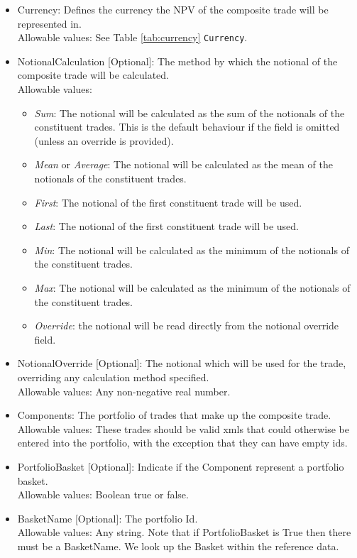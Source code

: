 \begin{itemize}
	\item Currency: Defines the currency the NPV of the composite trade will be represented in. \\
	  Allowable values:  See Table \ref{tab:currency} \lstinline!Currency!.
	\item NotionalCalculation [Optional]: The method by which the notional of the composite trade will be calculated. \\
	  Allowable values:
	  \begin{itemize}
	  	\item[] \emph{Sum}: The notional will be calculated as the sum of the notionals of the constituent trades. This is the default behaviour if the field is omitted (unless an override is provided).
	  	\item[] \emph{Mean} or \emph{Average}: The notional will be calculated as the mean of the notionals of the constituent trades.
	  	\item[] \emph{First}: The notional of the first constituent trade will be used.
	  	\item[] \emph{Last}: The notional of the first constituent trade will be used.
	  	\item[] \emph{Min}: The notional will be calculated as the minimum of the notionals of the constituent trades.
	  	\item[] \emph{Max}: The notional will be calculated as the minimum of the notionals of the constituent trades.
	  	\item[] \emph{Override}: the notional will be read directly from the notional override field.
	  \end{itemize}
	\item NotionalOverride [Optional]: The notional which will be used for the trade, overriding any calculation method specified. \\
      Allowable values: Any non-negative real number.
	\item Components: The portfolio of trades that make up the composite trade. \\
      Allowable values: These trades should be valid xmls that could otherwise be entered into the portfolio, with the exception that they can have empty ids.
    \item PortfolioBasket [Optional]: Indicate if the Component represent a portfolio basket. \\
    Allowable values: Boolean true or false.
    \item BasketName [Optional]: The portfolio Id. \\
    Allowable values: Any string. Note that if PortfolioBasket is True then there must be a BasketName. We look up the Basket within the reference data.
\end{itemize}